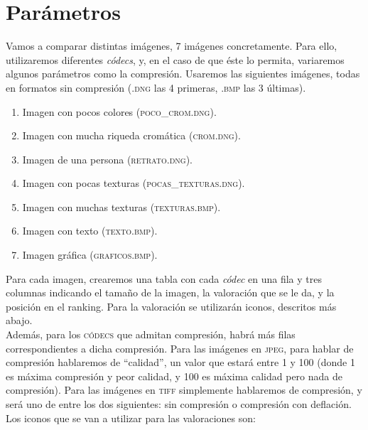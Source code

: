 \documentclass[11pt,a4paper]{article}
\begin{document}
\newpage

\section{Parámetros}

Vamos a comparar distintas imágenes, 7 imágenes concretamente. Para ello, utilizaremos diferentes \textit{códecs}, y, en el caso de que éste lo permita, variaremos algunos parámetros como la compresión. Usaremos las siguientes imágenes, todas en formatos sin compresión (\textsc{.dng} las 4 primeras, \textsc{.bmp} las 3 últimas).

\begin{enumerate}
	\item Imagen con pocos colores (\textsc{poco\_crom.dng}).
	\item Imagen con mucha riqueda cromática (\textsc{crom.dng}).
	\item Imagen de una persona (\textsc{retrato.dng}).
	\item Imagen con pocas texturas (\textsc{pocas\_texturas.dng}).
	\item Imagen con muchas texturas (\textsc{texturas.bmp}).
	\item Imagen con texto (\textsc{texto.bmp}).
	\item Imagen gráfica (\textsc{graficos.bmp}).
\end{enumerate}

Para cada imagen, crearemos una tabla con cada \textit{códec} en una fila y tres columnas indicando el tamaño de la imagen, la valoración que se le da, y la posición en el ranking. Para la valoración se utilizarán iconos, descritos más abajo.\\

Además, para los \textsc{códecs} que admitan compresión, habrá más filas correspondientes a dicha compresión. Para las imágenes en \textsc{jpeg}, para hablar de compresión hablaremos de ``calidad'', un valor que estará entre 1 y 100 (donde 1 es máxima compresión y peor calidad, y 100 es máxima calidad pero nada de compresión). Para las imágenes en \textsc{tiff} simplemente hablaremos de compresión, y será uno de entre los dos siguientes: sin compresión o compresión con deflación.\\

Los iconos que se van a utilizar para las valoraciones son:
\end{document}

